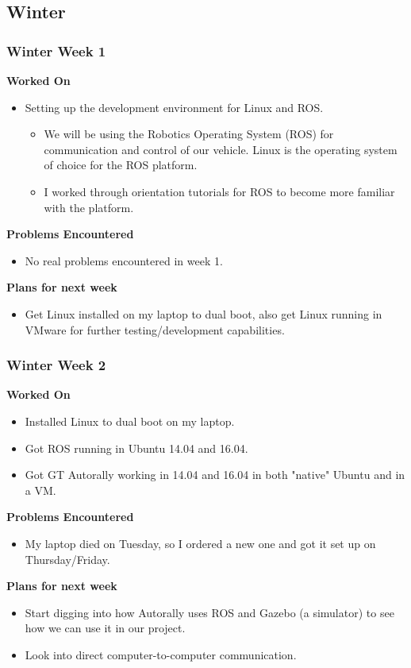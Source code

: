 \documentclass[compsoc,draftclsnofoot,onecolumn,10pt]{IEEEtran}
\begin{document}
\subsection{Winter}
\subsubsection*{Winter Week 1}
\textbf{Worked On}
\begin{itemize}
    \item Setting up the development environment for Linux and ROS.
    \begin{itemize}
        \item We will be using the Robotics Operating System (ROS) for communication and control of our vehicle. Linux is the operating system of choice for the ROS platform.
        \item I worked through orientation tutorials for ROS to become more familiar with the platform.
    \end{itemize}
\end{itemize}
\textbf{Problems Encountered}
\begin{itemize}
    \item No real problems encountered in week 1.
\end{itemize}
\textbf{Plans for next week}
\begin{itemize}
    \item Get Linux installed on my laptop to dual boot, also get Linux running in VMware for further testing/development capabilities.
\end{itemize}


\subsubsection*{Winter Week 2}
\textbf{Worked On}
\begin{itemize}
    \item Installed Linux to dual boot on my laptop.
    \item Got ROS running in Ubuntu 14.04 and 16.04.
    \item Got GT Autorally working in 14.04 and 16.04 in both "native" Ubuntu and in a VM.
\end{itemize}
\textbf{Problems Encountered}
\begin{itemize}
    \item My laptop died on Tuesday, so I ordered a new one and got it set up on Thursday/Friday.
\end{itemize}
\textbf{Plans for next week}
\begin{itemize}
    \item Start digging into how Autorally uses ROS and Gazebo (a simulator) to see how we can use it in our project.
    \item Look into direct computer-to-computer communication.
\end{itemize}
\end{document}
